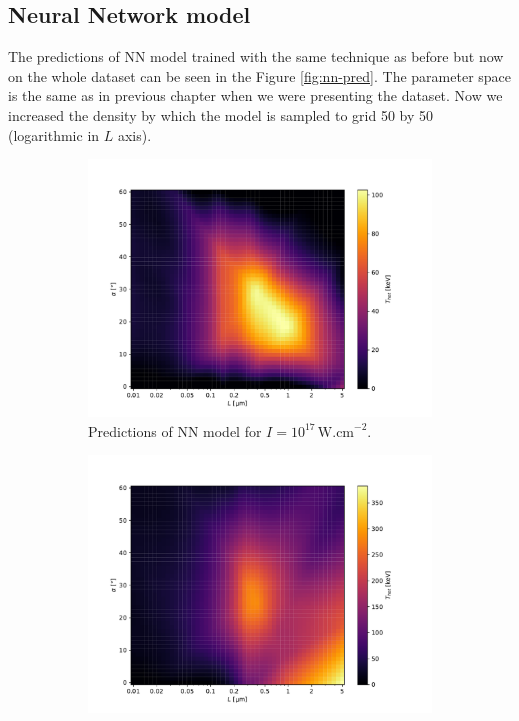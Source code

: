 \subsection*{Neural Network model}
The predictions of NN model trained with the same technique as before but now on the whole dataset can be seen in the Figure \ref{fig:nn-pred}. The parameter space is the same as in previous chapter when we were presenting the dataset. Now we increased the density by which the model is sampled to grid 50 by 50 (logarithmic in $L$ axis).
\begin{figure}[ht]
	\centering
	\begin{subfigure}{0.49\textwidth}
		\centering
		\includegraphics[width=\textwidth]{figures/nn17_pred}
		\caption{Predictions of NN model for $I =  10^{17} \, \mathrm{W.cm}^{-2}$.}
		\label{fig:nn-pred-a}
	\end{subfigure}
	\hfill
	\begin{subfigure}{0.49\textwidth}
		\centering
		\includegraphics[width=\textwidth]{figures/nn18_pred}

\end{subfigure}
\end{figure}
